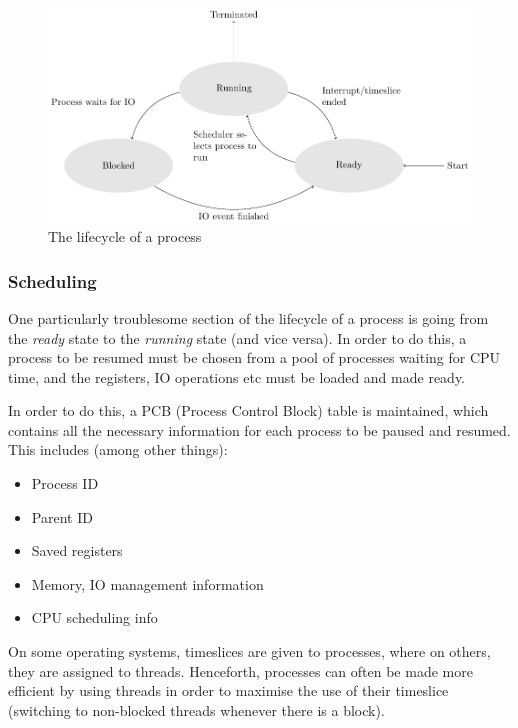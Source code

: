 \begin{figure}[ht!]
  \centering
  \includegraphics[width=\textwidth]{diagrams/process-lifecycle.pdf}
  \caption{The lifecycle of a process}
  \label{fig:proc-lifecycle}
\end{figure}

\subsubsection{Scheduling}
\label{scheduling}

One particularly troublesome section of the lifecycle of a process is going from
the \textit{ready} state to the \textit{running} state (and vice versa). In
order to do this, a process to be resumed must be chosen from a pool of
processes waiting for CPU time, and the registers, IO operations etc must be
loaded and made ready.

In order to do this, a PCB (Process Control Block) table is maintained, which
contains all the necessary information for each process to be paused and
resumed. This includes (among other things):

\begin{itemize}
  \item Process ID
  \item Parent ID
  \item Saved registers
  \item Memory, IO management information
  \item CPU scheduling info
\end{itemize}

On some operating systems, timeslices are given to processes, where on others,
they are assigned to threads. Henceforth, processes can often be made more
efficient by using threads in order to maximise the use of their timeslice
(switching to non-blocked threads whenever there is a block).


